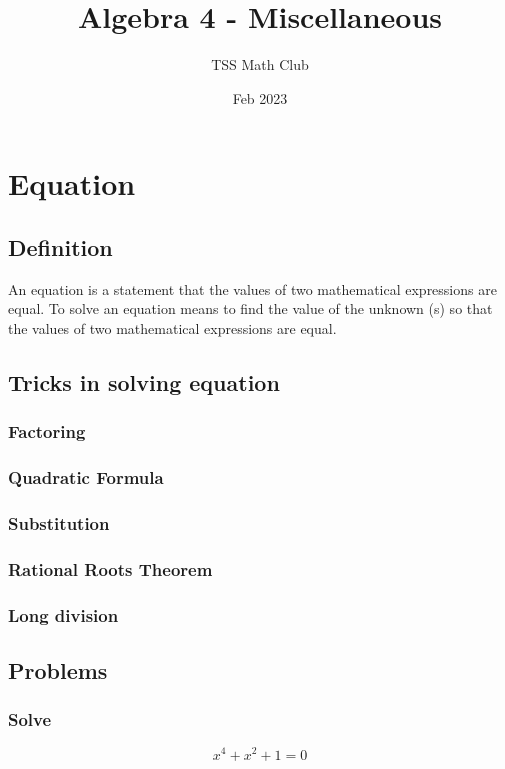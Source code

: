 \documentclass{article}
\title{Algebra 4 - Miscellaneous}
\author{TSS Math Club}
\date{Feb 2023}
\begin{document}
\large

\maketitle

\section{Equation}

\subsection{Definition}
An equation is a statement that the values of two mathematical expressions are equal.
To solve an equation means to find the value of the unknown (s) so that the values of two mathematical expressions are equal.

\subsection{Tricks in solving equation}

\subsubsection{Factoring}
\vspace{40px}
\subsubsection{Quadratic Formula}
\vspace{40px}
\subsubsection{Substitution}
\vspace{40px}
\subsubsection{Rational Roots Theorem}
\vspace{40px}
\subsubsection{Long division}
\vspace{40px}
\pagebreak
\subsection{Problems}
\subsubsection{Solve}
$$x^4+x^2+1=0$$
\vspace{40px}
\end{document}
